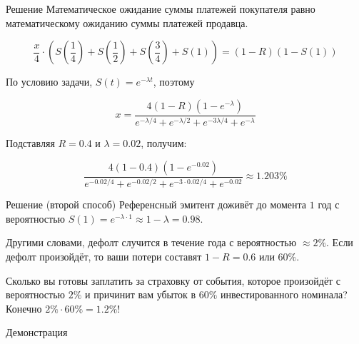 \documentclass{beamer}
\begin{document}
\begin{frame}{Решение}
\justify
Математическое ожидание суммы платежей покупателя равно математическому ожиданию суммы платежей продавца.

\begin{equation*}
\frac{x}{4} \cdot \left( S\left(\frac{1}{4}\right) + S\left(\frac{1}{2}\right) + S\left(\frac{3}{4}\right) +S\left(1\right) \right) = (1 - R)(1 - S(1))
\end{equation*}

По условию задачи, $S(t)=e^{-\lambda t}$, поэтому

\begin{equation*}
x = \frac{4(1 - R)(1 - e^{-\lambda})}{e^{-\lambda / 4} + e^{-\lambda / 2} + e^{-3\lambda / 4} + e^{-\lambda}}
\end{equation*}

Подставляя $R = 0.4$ и $\lambda = 0.02$, получим:

\begin{equation*}
\frac{4(1 - 0.4)(1 - e^{-0.02})}{e^{-0.02 / 4} + e^{-0.02 / 2} + e^{-3\cdot0.02 / 4} + e^{-0.02}} \approx 1.203\%
\end{equation*}
\end{frame}



\begin{frame}{Решение (второй способ)}
\justify
Референсный эмитент доживёт до момента $1$ год с вероятностью $S(1) = e^{-\lambda \cdot 1} \approx 1 - \lambda = 0.98$.

\vspace{\baselineskip}
Другими словами, дефолт случится в течение года с вероятностью $\approx 2\%$. Если дефолт произойдёт, то ваши потери составят $1 - R = 0.6$ или $60\%$.

\vspace{\baselineskip}
Сколько вы готовы заплатить за страховку от события, которое произойдёт с вероятностью $2\%$ и причинит вам убыток в $60\%$ инвестированного номинала? Конечно $2\% \cdot 60\% = 1.2\%$! 
\end{frame}



\begin{frame}{Демонстрация}
\end{frame}
\end{document}
